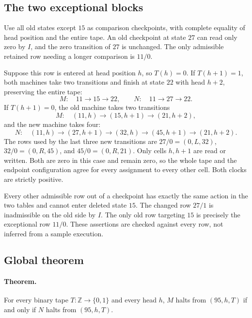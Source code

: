 \subsection{The two exceptional blocks}

Use all old states except $15$ as comparison checkpoints, with complete
equality of head position and the entire tape.  An old checkpoint at state
$27$ can read only zero by $I$, and the zero transition of $27$ is unchanged.
The only admissible retained row needing a longer comparison is $11/0$.

Suppose this row is entered at head position $h$, so $T(h)=0$.
If $T(h+1)=1$, both machines take two transitions and finish at state $22$
with head $h+2$, preserving the entire tape:
\[
M:\quad11\longrightarrow15\longrightarrow22,
\qquad
N:\quad11\longrightarrow27\longrightarrow22.
\]
If $T(h+1)=0$, the old machine takes two transitions
\[
M:\quad(11,h)\longrightarrow(15,h+1)\longrightarrow(21,h+2),
\]
and the new machine takes four:
\[
N:\quad(11,h)\longrightarrow(27,h+1)\longrightarrow(32,h)
\longrightarrow(45,h+1)\longrightarrow(21,h+2).
\]
The rows used by the last three new transitions are
$27/0=(0,L,32)$, $32/0=(0,R,45)$, and $45/0=(0,R,21)$.
Only cells $h,h+1$ are read or written.  Both are zero in this case and
remain zero, so the whole tape and the endpoint configuration agree for
every assignment to every other cell.  Both clocks are strictly positive.

Every other admissible row out of a checkpoint has exactly the same action
in the two tables and cannot enter deleted state $15$.  The changed row
$27/1$ is inadmissible on the old side by $I$.  The only old row targeting
$15$ is precisely the exceptional row $11/0$.  These assertions are checked
against every row, not inferred from a sample execution.

\subsection{Global theorem}

\paragraph{Theorem.}
For every binary tape $T:\mathbb Z\to\{0,1\}$ and every head $h$, $M$
halts from $(95,h,T)$ if and only if $N$ halts from $(95,h,T)$.


